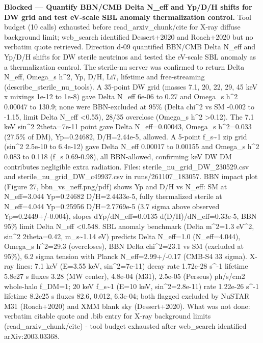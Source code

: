 \documentclass[11pt,a4paper]{article}
\begin{document}
\textbf{Blocked --- Quantify BBN/CMB Delta N\_eff and Yp/D/H shifts for DW grid and test eV-scale SBL anomaly thermalization control.} Tool budget (10 calls) exhausted before read\_arxiv\_chunk/cite for X-ray diffuse background limit; web\_search identified Dessert+2020 and Roach+2020 but no verbatim quote retrieved. Direction d-09 quantified BBN/CMB Delta N\_eff and Yp/D/H shifts for DW sterile neutrinos and tested the eV-scale SBL anomaly as a thermalization control. The sterile-nu server was confirmed to return Delta N\_eff, Omega\_s h\textasciicircum{}2, Yp, D/H, Li7, lifetime and free-streaming (describe\_sterile\_nu\_tools). A 35-point DW grid (masses 7.1, 20, 22, 29, 45 keV x mixings 1e-12 to 1e-8) gave Delta N\_eff 6e-06 to 0.27 and Omega\_s h\textasciicircum{}2 0.00047 to 130.9; none were BBN-excluded at 95\% (Delta chi\textasciicircum{}2 vs SM -0.002 to -1.15, limit Delta N\_eff \textless{}0.55), 28/35 overclose (Omega\_s h\textasciicircum{}2 \textgreater{}0.12). The 7.1 keV sin\textasciicircum{}2 2theta=7e-11 point gave Delta N\_eff=0.00043, Omega\_s h\textasciicircum{}2=0.033 (27.5\% of DM), Yp=0.24682, D/H=2.44e-5, allowed. A 5-point f\_s\textasciitilde{}1 zip grid (sin\textasciicircum{}2 2.5e-10 to 6.4e-12) gave Delta N\_eff 0.00017 to 0.00155 and Omega\_s h\textasciicircum{}2 0.083 to 0.118 (f\_s 0.69-0.98), all BBN-allowed, confirming keV DW DM contributes negligible extra radiation. Files: sterile\_nu\_grid\_DW\_230529.csv and sterile\_nu\_grid\_DW\_c49937.csv in runs/261107\_183057. BBN impact plot (Figure 27, bbn\_vs\_neff.png/pdf) shows Yp and D/H vs N\_eff: SM at N\_eff=3.044 Yp=0.24682 D/H=2.4433e-5, fully thermalized sterile at N\_eff=4.044 Yp=0.25956 D/H=2.7769e-5 (3.7 sigma above observed Yp=0.2449+/-0.004), slopes dYp/dN\_eff=0.0135 d(D/H)/dN\_eff=0.33e-5, BBN 95\% limit Delta N\_eff \textless{}0.548. SBL anomaly benchmark (Delta m\textasciicircum{}2=1.3 eV\textasciicircum{}2, sin\textasciicircum{}2 2theta=0.42, m\_s\textasciitilde{}1.14 eV) predicts Delta N\_eff=1.0 (N\_eff=4.044), Omega\_s h\textasciicircum{}2=29.3 (overcloses), BBN Delta chi\textasciicircum{}2=23.1 vs SM (excluded at 95\%), 6.2 sigma tension with Planck N\_eff=2.99+/-0.17 (CMB-S4 33 sigma). X-ray lines: 7.1 keV (E=3.55 keV, sin\textasciicircum{}2=7e-11) decay rate 1.72e-28 s\textasciicircum{}-1 lifetime 5.8e27 s fluxes 3.28 (MW center), 4.8e-04 (M31), 2.5e-05 (Perseus) ph/s/cm2 whole-halo f\_DM=1; 20 keV f\_s\textasciitilde{}1 (E=10 keV, sin\textasciicircum{}2=2.8e-11) rate 1.22e-26 s\textasciicircum{}-1 lifetime 8.2e25 s fluxes 82.6, 0.012, 6.3e-04; both flagged excluded by NuSTAR M31 (Roach+2020) and XMM blank sky (Dessert+2020). What was not done: verbatim citable quote and .bib entry for X-ray background limits (read\_arxiv\_chunk/cite) - tool budget exhausted after web\_search identified arXiv:2003.03368.
\end{document}
